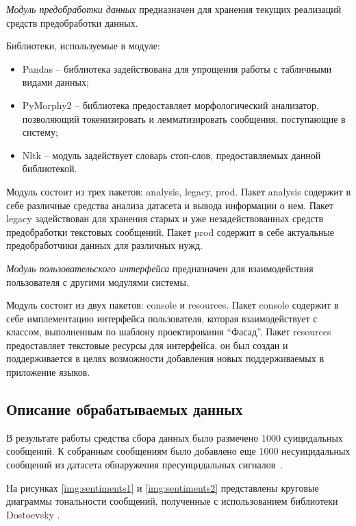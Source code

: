 \textit{Модуль предобработки данных} предназначен для хранения текущих реализаций средств предобработки данных.

Библиотеки, используемые в модуле:
\begin{itemize}
	\item Pandas -- библиотека задействована для упрощения работы с табличными видами данных;
	\item PyMorphy2 -- библиотека предоставляет морфологический анализатор, позволяющий токенизировать и лемматизировать сообщения, поступающие в систему;
	\item Nltk -- модуль задействует словарь стоп-слов, предоставляемых данной библиотекой.
\end{itemize}

Модуль состоит из трех пакетов: analysis, legacy, prod.
Пакет analysis содержит в себе различные средства анализа датасета и вывода информации о нем.
Пакет legacy задействован для хранения старых и уже незадействованных средств предобработки текстовых сообщений.
Пакет prod содержит в себе актуальные предобработчики данных для различных нужд.

\textit{Модуль пользовательского интерфейса} предназначен для взаимодействия пользователя с другими модулями системы.

Модуль состоит из двух пакетов: console и resources.
Пакет console содержит в себе имплементацию интерфейса пользователя, которая взаимодействует с классом, выполненным по шаблону проектирования ``Фасад''.
Пакет resources предоставляет текстовые ресурсы для интерфейса, он был создан и поддерживается в целях возможности добавления новых поддерживаемых в приложение языков.

\subsection{Описание обрабатываемых данных}

В результате работы средства сбора данных было размечено 1000 суицидальных сообщений. К собранным сообщениям было добавлено еще 1000 несуицидальных сообщений из датасета обнаружения пресуицидальных сигналов~\cite{dataset}. 

На рисунках \ref{img:sentiments1} и \ref{img:sentiments2} представлены круговые диаграммы тональности сообщений, полученные с использованием библиотеки Dostoevsky \cite{dostoevsky}. 

